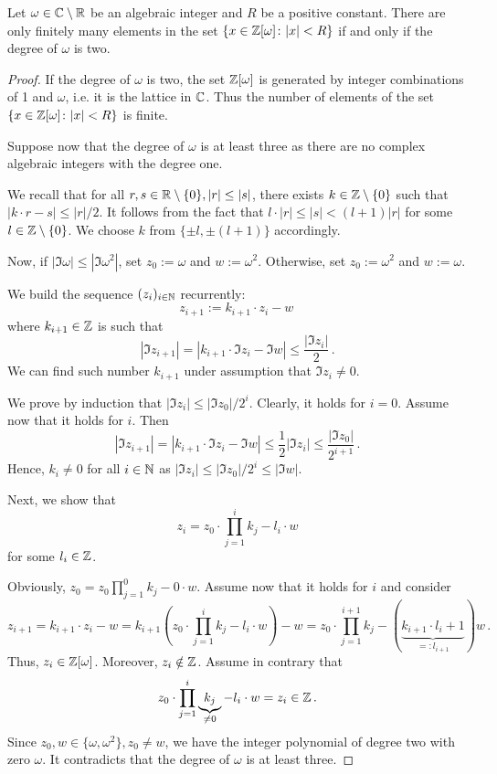 \begin{lem}
\label{lem:numElemCC}
Let $\omega\in \mathbb{C}\setminus\mathbb{R}$ be an algebraic integer and $R$ be a positive constant. There are only finitely many elements in the set $\left\{x \in\mathbb{Z}[\omega] \colon |x|<R\right\}$ if and only if the degree of $\omega$ is two.  
\end{lem}
\begin{proof}
If the degree of $\omega$ is two, the set $\mathbb{Z}[\omega]$ is generated by integer combinations of 1 and $\omega$, i.e. it is the lattice in $\mathbb{C}$. Thus the number of elements of the set $\left\{x \in\mathbb{Z}[\omega] \colon |x|<R\right\}$ is finite.

Suppose now that the degree of $\omega$ is at least three as there are no complex algebraic integers with the degree one. 


We recall that for all $r,s\in\mathbb{R}\setminus\{0\}, |r|\leq|s|$, there exists $k\in\mathbb{Z}\setminus\{0\}$ such that $|k\cdot r -s|\leq |r|/2$. It follows from the fact that $l\cdot |r| \leq |s| <(l+1)|r| $ for some $l\in\mathbb{Z}\setminus\{0\}$. We choose $k$ from $\{\pm l,\pm(l+1)\}$ accordingly. 
 
Now, if $|\Im \omega|\leq|\Im \omega^2|$, set $z_0:=\omega$ and $w:=\omega^2$. Otherwise, set $z_0:=\omega^2$ and $w:=\omega$.   

We build the sequence $(z_i)_{i\in\mathbb{N}}$ recurrently:
$$
z_{i+1}:=k_{i+1} \cdot z_{i}-w\, 
$$
where $k_{i+1}\in\mathbb{Z}$ is such that 
$$
|\Im z_{i+1}|=|k_{i+1} \cdot\Im z_{i}-\Im w|\leq \frac{|\Im z_{i}|}{2}\,.
$$
We can find such number $k_{i+1}$ under assumption that $\Im z_{i} \neq 0$.

We prove by induction that $|\Im z_i|\leq |\Im z_0|/2^i$. Clearly, it holds for $i=0$. Assume now that it holds for $i$. Then 
$$
|\Im z_{i+1}|= |k_{i+1} \cdot \Im z_{i}- \Im w|\leq \frac{1}{2}|\Im z_i|\leq \frac{|\Im z_0|}{2^{i+1}}\,. 
$$
Hence, $k_i\neq 0$ for all $i\in\mathbb{N}$ as $|\Im z_i|\leq |\Im z_0|/2^i \leq |\Im w|$.

Next, we show that
$$
z_i=z_0 \cdot \prod_{j=1}^i k_j- l_i\cdot w
$$
for some $l_i\in\mathbb{Z}$. 

Obviously, $z_0=z_0 \prod_{j=1}^0 k_j - 0\cdot w$. Assume now that it holds for $i$ and consider
$$
z_{i+1}=k_{i+1} \cdot z_{i}-w= k_{i+1}\left(z_0 \cdot \prod_{j=1}^i k_j- l_i\cdot w\right) -w=z_0 \cdot \prod_{j=1}^{i+1} k_j - (\underbrace{k_{i+1}\cdot l_i +1}_{=:l_{i+1}})w\,.
$$
Thus, $z_i\in\mathbb{Z}[\omega]$. Moreover, $z_i\notin \mathbb{Z}$. Assume in contrary that 
$$
z_0 \cdot \prod_{j=1}^i \underbrace{k_j}_{\neq0}- l_i\cdot w = z_i\in \mathbb{Z}\,.
$$
Since $z_0,w\in\{\omega, \omega^2\}, z_0\neq w$, we have the integer polynomial of degree two with zero $\omega$. It contradicts that the degree of $\omega$ is at least three.




\end{proof}
